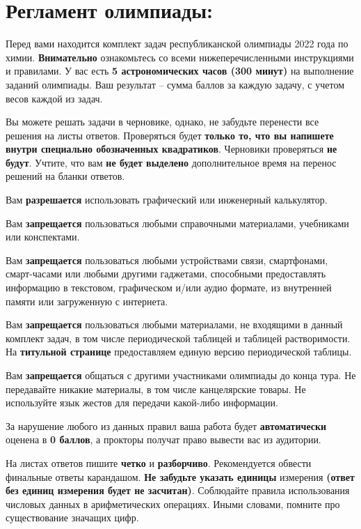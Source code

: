 \section*{Регламент олимпиады:}\vspace{5pt}

\begin{regulations}
Перед вами находится комплект задач республиканской олимпиады 2022 года по химии. \textbf{Внимательно} ознакомьтесь со всеми нижеперечисленными инструкциями и правилами. У вас есть \textbf{5 астрономических часов (300 минут)} на выполнение заданий олимпиады. Ваш результат – сумма баллов за каждую задачу, с учетом весов каждой из задач.

Вы можете решать задачи в черновике, однако, не забудьте перенести все решения на листы ответов. Проверяться будет \textbf{только то, что вы напишете внутри специально обозначенных квадратиков}. Черновики проверяться \textbf{не будут}. Учтите, что вам \textbf{не будет выделено} дополнительное время на перенос решений на бланки ответов.

Вам \textbf{разрешается} использовать графический или инженерный калькулятор.

Вам \textbf{запрещается} пользоваться любыми справочными материалами, учебниками или конспектами.

Вам \textbf{запрещается} пользоваться любыми устройствами связи, смартфонами, смарт-часами или любыми другими гаджетами, способными предоставлять информацию в текстовом, графическом и/или аудио формате, из внутренней памяти или загруженную с интернета.

Вам \textbf{запрещается} пользоваться любыми материалами, не входящими в данный комплект задач, в том числе периодической таблицей и таблицей растворимости. На \textbf{титульной странице} предоставляем единую версию периодической таблицы.

Вам \textbf{запрещается} общаться с другими участниками олимпиады до конца тура. Не передавайте никакие материалы, в том числе канцелярские товары. Не используйте язык жестов для передачи какой-либо информации.

За нарушение любого из данных правил ваша работа будет \textbf{автоматически} оценена в \textbf{0 баллов}, а прокторы получат право вывести вас из аудитории.

На листах ответов пишите \textbf{четко} и \textbf{разборчиво}. Рекомендуется обвести финальные ответы карандашом. \textbf{Не забудьте указать единицы} измерения \textbf{(ответ без единиц измерения будет не засчитан)}. Соблюдайте правила использования числовых данных в арифметических операциях. Иными словами, помните про существование значащих цифр.


\end{regulations}

